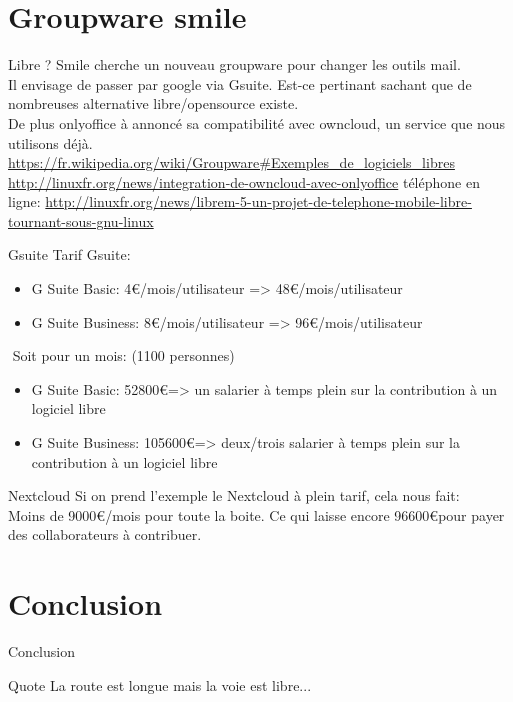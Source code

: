 \documentclass{beamer}
\begin{document}
\section{Groupware smile}
\begin{frame}{Libre ?}
Smile cherche un nouveau groupware pour changer les outils mail.\\
Il envisage de passer par google via Gsuite. Est-ce pertinant sachant que de nombreuses alternative libre/opensource existe.\\
De plus onlyoffice à annoncé sa compatibilité avec owncloud, un service que nous utilisons déjà.\\
\url{https://fr.wikipedia.org/wiki/Groupware\#Exemples\_de\_logiciels\_libres}
\\
\url{http://linuxfr.org/news/integration-de-owncloud-avec-onlyoffice}
\newline
téléphone en ligne: 
\url{http://linuxfr.org/news/librem-5-un-projet-de-telephone-mobile-libre-tournant-sous-gnu-linux}
\end{frame}

\begin{frame}{Gsuite}
	Tarif Gsuite:
	\begin{itemize}
		\item G Suite Basic: 4\euro/mois/utilisateur => 48\euro/mois/utilisateur
		\item G Suite Business: 8\euro/mois/utilisateur => 96\euro/mois/utilisateur
	\end{itemize}

	$ $\newline
	Soit pour un mois: \tiny(1100 personnes)\normalsize \\
	\begin{itemize}
		\item G Suite Basic: 52800\euro\space => un salarier à temps plein sur la contribution à un logiciel libre
		\item G Suite Business: 105600\euro\space => deux/trois salarier à temps plein sur la contribution à un logiciel libre
	\end{itemize}
\end{frame}

\begin{frame}{Nextcloud}
	Si on prend l'exemple le Nextcloud à plein tarif, cela nous fait: \\
	Moins de 9000\euro/mois pour toute la boite. \newline
	\newline
	Ce qui laisse encore 96600\euro pour payer des collaborateurs à contribuer.
\end{frame}


\section{Conclusion}
\begin{frame}{Conclusion}
	\begin{block}{Quote}
		La route est longue mais la voie est libre...
	\end{block}
\end{frame}
\end{document}
